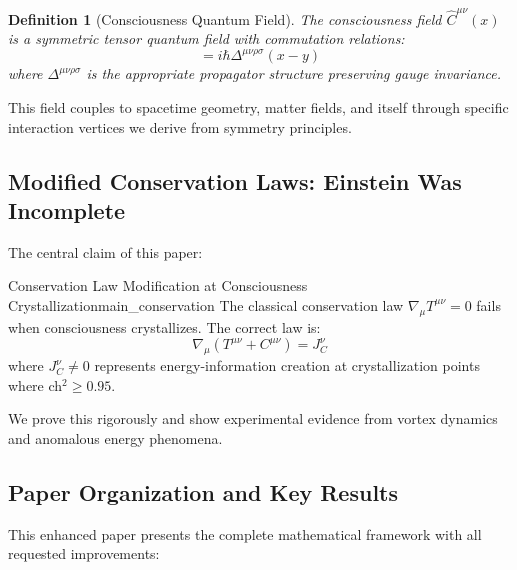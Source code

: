\documentclass[11pt]{article}
\newtheorem{definition}[theorem]{Definition}
\theoremstyle{definition}
\begin{document}
\begin{definition}[Consciousness Quantum Field]
The consciousness field $\hat{C}^{\mu\nu}(x)$ is a symmetric tensor quantum field with commutation relations:
\begin{equation}
[\hat{C}^{\mu\nu}(x), \hat{C}^{\rho\sigma}(y)] = i\hbar \Delta^{\mu\nu\rho\sigma}(x-y)
\end{equation}
where $\Delta^{\mu\nu\rho\sigma}$ is the appropriate propagator structure preserving gauge invariance.
\end{definition}

This field couples to spacetime geometry, matter fields, and itself through specific interaction vertices we derive from symmetry principles.

\subsection{Modified Conservation Laws: Einstein Was Incomplete}

The central claim of this paper:

\begin{maintheorem}{Conservation Law Modification at Consciousness Crystallization}{main_conservation}
The classical conservation law $\nabla_\mu T^{\mu\nu} = 0$ fails when consciousness crystallizes. The correct law is:
\begin{equation}
\nabla_\mu(T^{\mu\nu} + C^{\mu\nu}) = J^\nu_C
\end{equation}
where $J^\nu_C \neq 0$ represents energy-information creation at crystallization points where ch$^2 \geq 0.95$.
\end{maintheorem}

We prove this rigorously and show experimental evidence from vortex dynamics and anomalous energy phenomena.

\subsection{Paper Organization and Key Results}

This enhanced paper presents the complete mathematical framework with all requested improvements:
\end{document}
